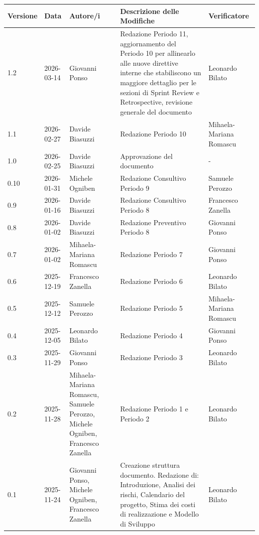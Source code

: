 \documentclass[a4paper, 11pt, oneside]{scrartcl} %
\begin{document}
\begin{center}
\renewcommand{\arraystretch}{1.2}
\begin{tabularx}{\textwidth}{@{}p{}p{}p{}X>{\centering\arraybackslash}p{}@{}}
\toprule
\textbf{Versione} & \textbf{Data} & \textbf{Autore/i} & \textbf{Descrizione delle Modifiche} & \textbf{Verificatore} \\
\midrule
1.2 & 2026-03-14 & Giovanni Ponso & Redazione Periodo 11, aggiornamento del Periodo 10 per allinearlo alle nuove direttive interne che stabiliscono un maggiore dettaglio per le sezioni di Sprint Review e Retrospective, revisione generale del documento & Leonardo Bilato \\
1.1 & 2026-02-27 & Davide Biasuzzi & Redazione Periodo 10 & Mihaela-Mariana Romascu \\
1.0 & 2026-02-25 & Davide Biasuzzi & Approvazione del documento & - \\
0.10 & 2026-01-31 & Michele Ogniben & Redazione Consultivo Periodo 9 & Samuele Perozzo \\
0.9 & 2026-01-16 & Davide Biasuzzi & Redazione Consultivo Periodo 8 & Francesco Zanella \\
0.8 & 2026-01-02 & Davide Biasuzzi & Redazione Preventivo Periodo 8 & Giovanni Ponso \\
0.7 & 2026-01-02 & Mihaela-Mariana Romascu & Redazione Periodo 7 & Giovanni Ponso \\
0.6 & 2025-12-19 & Francesco Zanella & Redazione Periodo 6 & Leonardo Bilato \\
0.5 & 2025-12-12 & Samuele Perozzo & Redazione Periodo 5 & Mihaela-Mariana Romascu \\
0.4 & 2025-12-05 & Leonardo Bilato & Redazione Periodo 4 & Giovanni Ponso \\
0.3 & 2025-11-29 & Giovanni Ponso & Redazione Periodo 3 & Leonardo Bilato \\
0.2 & 2025-11-28 & Mihaela-Mariana Romascu, Samuele Perozzo, Michele Ogniben, Francesco Zanella & Redazione Periodo 1 e Periodo 2 & Leonardo Bilato \\
0.1 & 2025-11-24 & Giovanni Ponso, Michele Ogniben, Francesco Zanella & Creazione struttura documento. Redazione di: Introduzione, Analisi dei rischi, Calendario del progetto, Stima dei costi di realizzazione e Modello di Sviluppo & Leonardo Bilato \\
\bottomrule
\end{tabularx}
\end{center}
\end{document}

